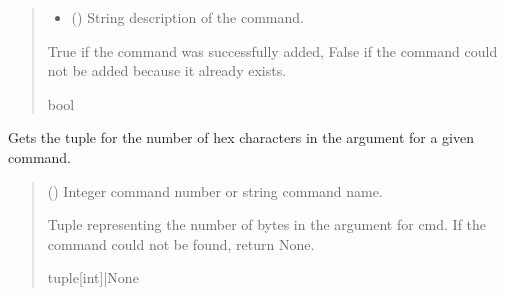 \documentclass[letterpaper,10pt,english]{sphinxmanual}
\begin{document}
\begin{fulllineitems}
\begin{fulllineitems}
\begin{quote}
\begin{description}
\begin{itemize}
\item {} 
\sphinxAtStartPar
{} () \textendash{} String description of the command.

\end{itemize}

\sphinxAtStartPar
True if the command was successfully added, False if the command could not be added                 because it already exists.

\sphinxAtStartPar
bool

\end{description}\end{quote}

\end{fulllineitems}


\begin{fulllineitems}
\label{\detokenize{PodCommands:PodCommands.POD_Commands.ArgumentHexChar}}
\pysigstartsignatures
{}
\pysigstopsignatures
\sphinxAtStartPar
Gets the tuple for the number of hex characters in the argument for a given command.
\begin{quote}\begin{description}
\sphinxAtStartPar
{} (\sphinxstyleliteralemphasis{\sphinxupquote{ | }}) \textendash{} Integer command number or string command name.

\sphinxAtStartPar
Tuple representing the number of bytes in the argument for cmd. If the                 command could not be found, return None.

\sphinxAtStartPar
tuple{[}int{]}|None

\end{description}\end{quote}


\end{fulllineitems}
\end{fulllineitems}
\end{document}
